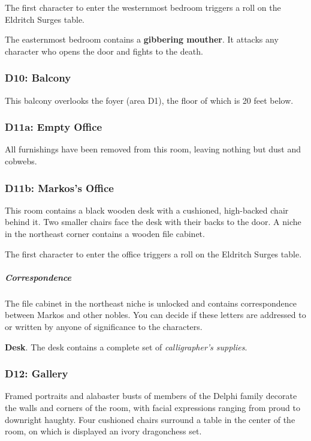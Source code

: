 \documentclass[10pt,a4paper,twoside,bg=print,twocolumn,openany,nodeprecatedcode]{dndbook}
\begin{document}
The first character to enter the westernmost bedroom triggers a roll on the Eldritch Surges table.

The easternmost bedroom contains a \textbf{gibbering mouther}. It attacks any character who opens the door and fights to the death.

\subsubsection{D10: Balcony}
This balcony overlooks the foyer (area D1), the floor of which is 20 feet below.

\subsubsection{D11a: Empty Office}
All furnishings have been removed from this room, leaving nothing but dust and cobwebs.

\subsubsection{D11b: Markos's Office}
\begin{DndReadAloud}{}
This room contains a black wooden desk with a cushioned, high-backed chair behind it. Two smaller chairs face the desk with their backs to the door. A niche in the northeast corner contains a wooden file cabinet.

\end{DndReadAloud}

The first character to enter the office triggers a roll on the Eldritch Surges table.

\subparagraph{Correspondence}
The file cabinet in the northeast niche is unlocked and contains correspondence between Markos and other nobles. You can decide if these letters are addressed to or written by anyone of significance to the characters.

\textbf{Desk}. The desk contains a complete set of \textit{calligrapher's supplies}.

\subsubsection{D12: Gallery}
\begin{DndReadAloud}{}
Framed portraits and alabaster busts of members of the Delphi family decorate the walls and corners of the room, with facial expressions ranging from proud to downright haughty. Four cushioned chairs surround a table in the center of the room, on which is displayed an ivory dragonchess set.

\end{DndReadAloud}
\end{document}
